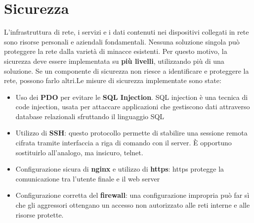 
\section{Sicurezza}
L'infrastruttura di rete, i servizi e i dati contenuti nei dispositivi collegati in rete sono risorse personali e aziendali fondamentali. Nessuna soluzione singola può proteggere la rete dalla varietà di minacce esistenti. Per questo motivo, la sicurezza deve essere implementata su \textbf{più livelli}, utilizzando più di una soluzione. Se un componente di sicurezza non riesce a identificare e proteggere la rete, possono farlo altri.\clearpage Le misure di sicurezza implementate sono state:
\begin{itemize}
    \item Uso dei \textbf{PDO} per evitare le \textbf{SQL Injection}. SQL injection è una tecnica di code injection, usata per attaccare applicazioni che gestiscono dati attraverso database relazionali sfruttando il linguaggio SQL
    \item Utilizzo di \textbf{SSH}: questo protocollo permette di stabilire una sessione remota cifrata tramite interfaccia a riga di comando con il server. È opportuno sostituirlo all'analogo, ma insicuro, telnet.
    \item Configurazione sicura di \textbf{nginx} e utilizzo di \textbf{https}: https protegge la comunicazione tra l'utente finale e il web server
    \item Configurazione corretta del \textbf{firewall}: una configurazione impropria può far sì che gli aggressori ottengano un accesso non autorizzato alle reti interne e alle risorse protette.
\end{itemize}

